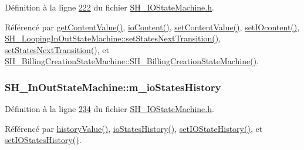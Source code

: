 Définition à la ligne \hyperlink{SH__IOStateMachine_8h_source_l00222}{222} du fichier \hyperlink{SH__IOStateMachine_8h_source}{S\-H\-\_\-\-I\-O\-State\-Machine.\-h}.



Référencé par \hyperlink{classSH__InOutStateMachine_aa1a3bd3c0ea8a59b9bc916dc718eb9ca}{get\-Content\-Value()}, \hyperlink{classSH__InOutStateMachine_aaca105fbd5f5cc3bac115389ad3694c5}{io\-Content()}, \hyperlink{classSH__InOutStateMachine_a9ab1534306b2bdb62743d4bcefe40c17}{set\-Content\-Value()}, \hyperlink{classSH__InOutStateMachine_a8271a7ec7d5f6502449dd3b4da5f4155}{set\-I\-Ocontent()}, \hyperlink{classSH__LoopingInOutStateMachine_a0ee122553641721012f3710e71cce234}{S\-H\-\_\-\-Looping\-In\-Out\-State\-Machine\-::set\-States\-Next\-Transition()}, \hyperlink{classSH__InOutStateMachine_a70d6d81c0a8d4afd6aab0a7239edc237}{set\-States\-Next\-Transition()}, et \hyperlink{classSH__BillingCreationStateMachine_ad62b77fa4aeafe200056ff3974562f83}{S\-H\-\_\-\-Billing\-Creation\-State\-Machine\-::\-S\-H\-\_\-\-Billing\-Creation\-State\-Machine()}.

\hypertarget{classSH__InOutStateMachine_ac46ad1af230e1b2156d805275690dec3}{
\subsubsection[{m\-\_\-io\-States\-History}]{\setlength{\rightskip}{0pt plus 5cm}S\-H\-\_\-\-In\-Out\-State\-Machine\-::m\-\_\-io\-States\-History\hspace{0.3cm}{\ttfamily [protected]}}}\label{classSH__InOutStateMachine_ac46ad1af230e1b2156d805275690dec3}


Définition à la ligne \hyperlink{SH__IOStateMachine_8h_source_l00234}{234} du fichier \hyperlink{SH__IOStateMachine_8h_source}{S\-H\-\_\-\-I\-O\-State\-Machine.\-h}.



Référencé par \hyperlink{classSH__InOutStateMachine_af71bfdb3b59b7bf2763588b513b4205f}{history\-Value()}, \hyperlink{classSH__InOutStateMachine_a13889998c6dcd17db984dd6ed1454e80}{io\-States\-History()}, \hyperlink{classSH__InOutStateMachine_acbcce2c4300af1634d928b30e5e9be1c}{set\-I\-O\-State\-History()}, et \hyperlink{classSH__InOutStateMachine_af51f92c37d00a4eec4da42113cfd7d73}{set\-I\-O\-States\-History()}.

